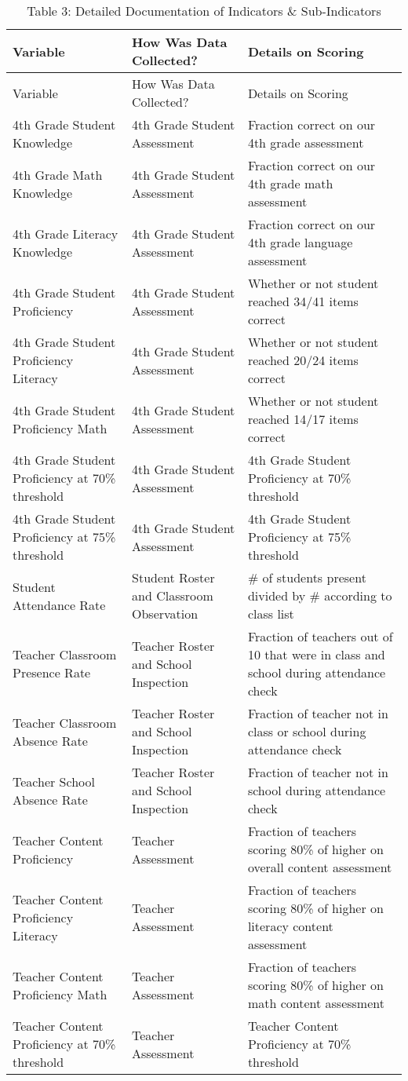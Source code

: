 \documentclass[]{article}
\begin{document}
\begin{longtable}[]{@{}lll@{}}
\caption{Table 3: Detailed Documentation of Indicators \&
Sub-Indicators}\tabularnewline
\toprule
Variable & How Was Data Collected? & Details on Scoring\tabularnewline
\midrule
\endfirsthead
\toprule
Variable & How Was Data Collected? & Details on Scoring\tabularnewline
\midrule
\endhead
4th Grade Student Knowledge & 4th Grade Student Assessment & Fraction
correct on our 4th grade assessment\tabularnewline
4th Grade Math Knowledge & 4th Grade Student Assessment & Fraction
correct on our 4th grade math assessment\tabularnewline
4th Grade Literacy Knowledge & 4th Grade Student Assessment & Fraction
correct on our 4th grade language assessment\tabularnewline
4th Grade Student Proficiency & 4th Grade Student Assessment & Whether
or not student reached 34/41 items correct\tabularnewline
4th Grade Student Proficiency Literacy & 4th Grade Student Assessment &
Whether or not student reached 20/24 items correct\tabularnewline
4th Grade Student Proficiency Math & 4th Grade Student Assessment &
Whether or not student reached 14/17 items correct\tabularnewline
4th Grade Student Proficiency at 70\% threshold & 4th Grade Student
Assessment & 4th Grade Student Proficiency at 70\%
threshold\tabularnewline
4th Grade Student Proficiency at 75\% threshold & 4th Grade Student
Assessment & 4th Grade Student Proficiency at 75\%
threshold\tabularnewline
Student Attendance Rate & Student Roster and Classroom Observation & \#
of students present divided by \# according to class list\tabularnewline
Teacher Classroom Presence Rate & Teacher Roster and School Inspection &
Fraction of teachers out of 10 that were in class and school during
attendance check\tabularnewline
Teacher Classroom Absence Rate & Teacher Roster and School Inspection &
Fraction of teacher not in class or school during attendance
check\tabularnewline
Teacher School Absence Rate & Teacher Roster and School Inspection &
Fraction of teacher not in school during attendance check\tabularnewline
Teacher Content Proficiency & Teacher Assessment & Fraction of teachers
scoring 80\% of higher on overall content assessment\tabularnewline
Teacher Content Proficiency Literacy & Teacher Assessment & Fraction of
teachers scoring 80\% of higher on literacy content
assessment\tabularnewline
Teacher Content Proficiency Math & Teacher Assessment & Fraction of
teachers scoring 80\% of higher on math content
assessment\tabularnewline
Teacher Content Proficiency at 70\% threshold & Teacher Assessment &
Teacher Content Proficiency at 70\% threshold\tabularnewline

\end{longtable}
\end{document}
